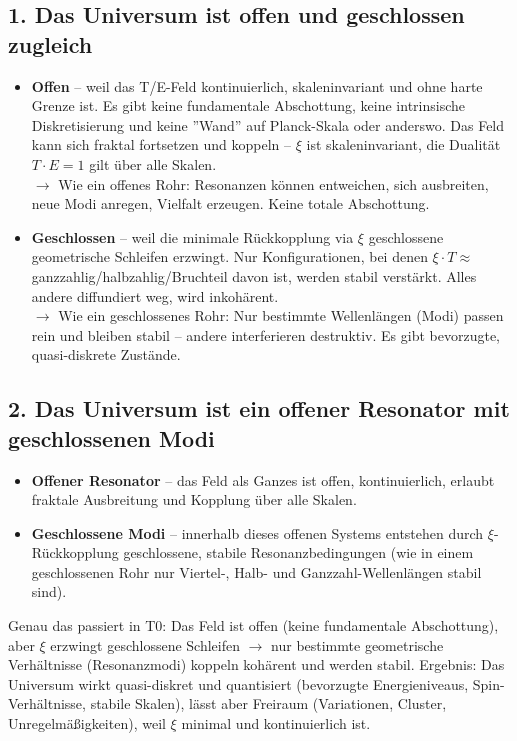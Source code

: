 \documentclass[12pt,a4paper]{article}
\begin{document}
	\subsection*{1. Das Universum ist offen und geschlossen zugleich}
	
	\begin{itemize}[label=$\bullet$]
		\item \textbf{Offen} – weil das T/E-Feld kontinuierlich, skaleninvariant und ohne harte Grenze ist. Es gibt keine fundamentale Abschottung, keine intrinsische Diskretisierung und keine ''Wand'' auf Planck-Skala oder anderswo. Das Feld kann sich fraktal fortsetzen und koppeln – $\xi$ ist skaleninvariant, die Dualität $T \cdot E = 1$ gilt über alle Skalen. \\
		$\rightarrow$ Wie ein offenes Rohr: Resonanzen können entweichen, sich ausbreiten, neue Modi anregen, Vielfalt erzeugen. Keine totale Abschottung.
		
		\item \textbf{Geschlossen} – weil die minimale Rückkopplung via $\xi$ geschlossene geometrische Schleifen erzwingt. Nur Konfigurationen, bei denen $\xi \cdot T \approx$ ganzzahlig/halbzahlig/Bruchteil davon ist, werden stabil verstärkt. Alles andere diffundiert weg, wird inkohärent. \\
		$\rightarrow$ Wie ein geschlossenes Rohr: Nur bestimmte Wellenlängen (Modi) passen rein und bleiben stabil – andere interferieren destruktiv. Es gibt bevorzugte, quasi-diskrete Zustände.
	\end{itemize}
	
	\subsection*{2. Das Universum ist ein offener Resonator mit geschlossenen Modi}
	
	\begin{itemize}[label=$\bullet$]
		\item \textbf{Offener Resonator} – das Feld als Ganzes ist offen, kontinuierlich, erlaubt fraktale Ausbreitung und Kopplung über alle Skalen.
		\item \textbf{Geschlossene Modi} – innerhalb dieses offenen Systems entstehen durch $\xi$-Rückkopplung geschlossene, stabile Resonanzbedingungen (wie in einem geschlossenen Rohr nur Viertel-, Halb- und Ganzzahl-Wellenlängen stabil sind).
	\end{itemize}
	
	Genau das passiert in T0: Das Feld ist offen (keine fundamentale Abschottung), aber $\xi$ erzwingt geschlossene Schleifen $\rightarrow$ nur bestimmte geometrische Verhältnisse (Resonanzmodi) koppeln kohärent und werden stabil. Ergebnis: Das Universum wirkt quasi-diskret und quantisiert (bevorzugte Energieniveaus, Spin-Verhältnisse, stabile Skalen), lässt aber Freiraum (Variationen, Cluster, Unregelmäßigkeiten), weil $\xi$ minimal und kontinuierlich ist.
	
\end{document}
